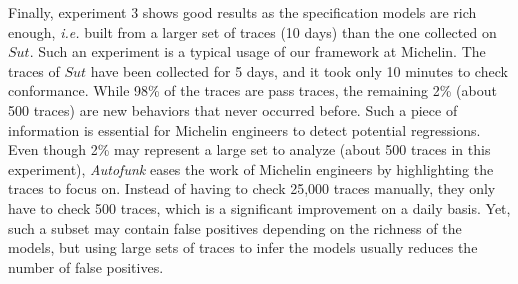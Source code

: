 Finally, experiment $3$ shows good results as the specification
models are rich enough, \emph{i.e.}  built from a larger set of
traces (10 days) than the one collected on $\mathit{Sut}$. Such
an experiment is a typical usage of our framework at Michelin.
The traces of $\mathit{Sut}$ have been collected for 5 days, and
it took only 10 minutes to check conformance. While 98\% of the
traces are pass traces, the remaining 2\% (about 500 traces) are
new behaviors that never occurred before. Such a piece of
information is essential for Michelin engineers to detect
potential regressions. Even though 2\% may represent a large set
to analyze (about 500 traces in this experiment),
\textit{Autofunk} eases the work of Michelin engineers by
highlighting the traces to focus on. Instead of having to check
25,000 traces manually, they only have to check 500 traces, which
is a significant improvement on a daily basis.
Yet, such a subset may contain false positives depending on the
richness of the models, but using large sets of traces to infer
the models usually reduces the number of false positives.
